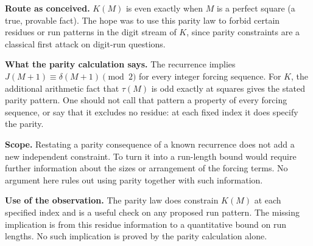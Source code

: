 \begin{obs}
\label{obs:parity-squares}
\textbf{Route as conceived.} $K(M)$ is even exactly when $M$ is a perfect square (a true,
provable fact). The hope was to use this parity law to forbid certain residues or run patterns in
the digit stream of $K$, since parity constraints are a classical first attack on digit-run
questions.

\textbf{What the parity calculation says.} The recurrence implies
$J(M+1)\equiv\delta(M+1)\pmod2$ for every integer forcing sequence.
For $K$, the additional arithmetic fact that $\tau(M)$ is odd exactly
at squares gives the stated parity pattern.  One should not call that
pattern a property of every forcing sequence, or say that it excludes
no residue: at each fixed index it does specify the parity.

\textbf{Scope.} Restating a parity consequence of a known recurrence
does not add a new independent constraint.  To turn it into a
run-length bound would require further information about the sizes or
arrangement of the forcing terms.  No argument here rules out using
parity together with such information.

\textbf{Use of the observation.} The parity law does constrain
$K(M)$ at each specified index and is a useful check on any proposed
run pattern.  The missing implication is from this residue information
to a quantitative bound on run lengths.  No such implication is
proved by the parity calculation alone.
\end{obs}

